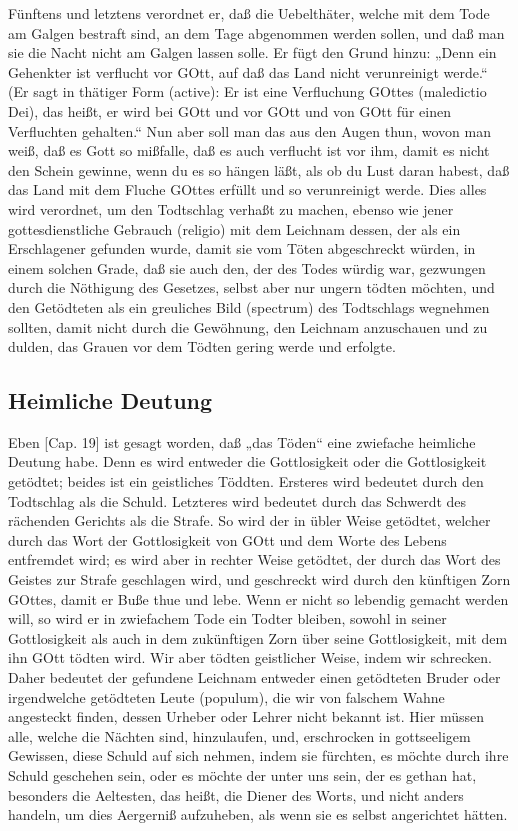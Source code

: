 Fünftens und letztens verordnet er, daß die Uebelthäter, welche mit dem Tode am Galgen bestraft sind, an dem Tage abgenommen werden sollen, und daß man sie die Nacht nicht am Galgen lassen solle. Er fügt den Grund hinzu: „Denn ein Gehenkter ist verflucht vor GOtt, auf daß das Land nicht verunreinigt werde.“ (Er sagt in thätiger Form (active): Er ist eine Verfluchung GOttes (maledictio Dei), das heißt, er wird bei GOtt und vor GOtt und von GOtt für einen Verfluchten gehalten.“ Nun aber soll man das aus den Augen thun, wovon man weiß, daß es Gott so mißfalle, daß es auch verflucht ist vor ihm, damit es nicht den Schein gewinne, wenn du es so hängen läßt, als ob du Lust daran habest, daß das Land mit dem Fluche GOttes erfüllt und so verunreinigt werde. Dies alles wird verordnet, um den Todtschlag verhaßt zu machen, ebenso wie jener gottesdienstliche Gebrauch (religio) mit dem Leichnam dessen, der als ein Erschlagener gefunden wurde, damit sie vom Töten abgeschreckt würden, in einem solchen Grade, daß sie auch den, der des Todes würdig war, gezwungen durch die Nöthigung des Gesetzes, selbst aber nur ungern tödten möchten, und den Getödteten als ein greuliches Bild (spectrum) des Todtschlags wegnehmen sollten, damit nicht durch die Gewöhnung, den Leichnam anzuschauen und zu dulden, das Grauen vor dem Tödten gering werde und erfolgte.

\subsection{Heimliche Deutung}

Eben [Cap. 19] ist gesagt worden, daß „das Töden“ eine zwiefache heimliche Deutung habe. Denn es wird entweder die Gottlosigkeit oder die Gottlosigkeit getödtet; beides ist ein geistliches Töddten. Ersteres wird bedeutet durch den Todtschlag als die Schuld. Letzteres wird bedeutet durch das Schwerdt des rächenden Gerichts als die Strafe. So wird der in übler Weise getödtet, welcher durch das Wort der Gottlosigkeit von GOtt und dem Worte des Lebens entfremdet wird; es wird aber in rechter Weise getödtet, der durch das Wort des Geistes zur Strafe geschlagen wird, und geschreckt wird durch den künftigen Zorn GOttes, damit er Buße thue und lebe. Wenn er nicht so lebendig gemacht werden
will, so wird er in zwiefachem Tode ein Todter bleiben, sowohl in seiner Gottlosigkeit als auch in dem zukünftigen Zorn über seine Gottlosigkeit, mit dem ihn GOtt tödten wird. Wir aber tödten geistlicher Weise, indem wir schrecken. Daher bedeutet der gefundene Leichnam entweder einen getödteten Bruder oder irgendwelche getödteten Leute (populum), die wir von falschem Wahne angesteckt finden, dessen Urheber oder Lehrer nicht bekannt ist. Hier müssen alle, welche die Nächten sind, hinzulaufen, und, erschrocken in gottseeligem Gewissen, diese Schuld auf sich nehmen, indem sie fürchten, es möchte durch ihre Schuld geschehen sein, oder es möchte der unter uns sein, der es gethan hat, besonders die Aeltesten, das heißt, die Diener des Worts, und nicht anders handeln, um dies Aergerniß aufzuheben, als wenn sie es selbst angerichtet hätten.

